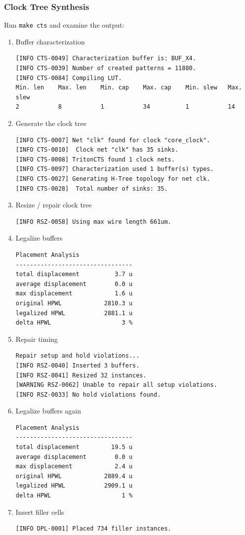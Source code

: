 \documentclass[a4paper,12pt,twoside]{article}
\begin{document}
\subsubsection{Clock Tree Synthesis}
Run \texttt{make cts} and examine the output:
\begin{enumerate}
    \item Buffer characterization
    \begin{verbatim}
[INFO CTS-0049] Characterization buffer is: BUF_X4.
[INFO CTS-0039] Number of created patterns = 11880.
[INFO CTS-0084] Compiling LUT.
Min. len    Max. len    Min. cap    Max. cap    Min. slew   Max. slew
2           8           1           34          1           14
    \end{verbatim}
    \item Generate the clock tree
    \begin{verbatim}
[INFO CTS-0007] Net "clk" found for clock "core_clock".
[INFO CTS-0010]  Clock net "clk" has 35 sinks.
[INFO CTS-0008] TritonCTS found 1 clock nets.
[INFO CTS-0097] Characterization used 1 buffer(s) types.
[INFO CTS-0027] Generating H-Tree topology for net clk.
[INFO CTS-0028]  Total number of sinks: 35.
    \end{verbatim}
    \item Resize / repair clock tree
    \begin{verbatim}
[INFO RSZ-0058] Using max wire length 661um.
    \end{verbatim}
    \item Legalize buffers
    \begin{verbatim}
Placement Analysis
---------------------------------
total displacement          3.7 u
average displacement        0.0 u
max displacement            1.6 u
original HPWL            2810.3 u
legalized HPWL           2881.1 u
delta HPWL                    3 %
    \end{verbatim}
    \item Repair timing
    \begin{verbatim}
Repair setup and hold violations...
[INFO RSZ-0040] Inserted 3 buffers.
[INFO RSZ-0041] Resized 32 instances.
[WARNING RSZ-0062] Unable to repair all setup violations.
[INFO RSZ-0033] No hold violations found.
    \end{verbatim}
    \item Legalize buffers again
    \begin{verbatim}
Placement Analysis
---------------------------------
total displacement         19.5 u
average displacement        0.0 u
max displacement            2.4 u
original HPWL            2889.4 u
legalized HPWL           2909.1 u
delta HPWL                    1 %
    \end{verbatim}
    \item Insert filler cells
    \begin{verbatim}
[INFO DPL-0001] Placed 734 filler instances.
    \end{verbatim}
\end{enumerate}
\end{document}
